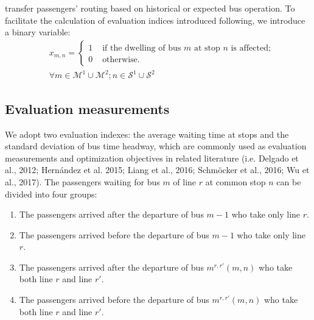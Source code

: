 \documentclass[smallextended]{svjour3}       %
\begin{document}
\begin{Abstract}
transfer passengers' routing based on historical or expected bus operation.
To facilitate the calculation of evaluation indices introduced following, 
we introduce a binary variable: 
\begin{equation}
    \begin{split}
        &x_{m,n}=
        \begin{cases}
            1&\text{ if the dwelling of bus } m \text{ at stop } n \text{ is affected;}\\
            0&\text{ otherwise.}
        \end{cases}\\
        &\forall m \in \mathcal{M}^{1}\cup\mathcal{M}^{2}; n \in \mathcal{S}^{1}\cup\mathcal{S}^{2}        
    \end{split}
\end{equation}
\subsection{Evaluation measurements}
We adopt two evaluation indexes: 
the average waiting time at stops and the standard deviation of bus time headway, which are commonly used 
as evaluation measurements and optimization objectives in related literature (i.e. Delgado et al., 2012; Hernández et al. 2015; Liang et al., 2016; Schmöcker et al., 2016; Wu et al., 2017).
The passengers waiting for bus $m$ of line $r$ at common stop $n$ can be divided into four groups:
\begin{enumerate}[1)]
    \item The passengers arrived after the departure of bus $m-1$ who take only line $r$.
    \item The passengers arrived before the departure of bus $m-1$ who take only line $r$.
    \item The passengers arrived after the departure of bus $m^{r,r'}(m,n)$ who take both line $r$ and line $r'$.
    \item The passengers arrived before the departure of bus $m^{r,r'}(m,n)$ who take both line $r$ and line $r'$.
\end{enumerate} 


\end{Abstract}
\end{document}
